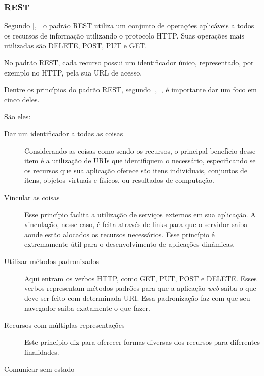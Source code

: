 \documentclass[
	12pt,				%
	oneside,			%
	a4paper,			%
	brazil				%
]{abntex2}
\newcommand{\citecustom}[1]{[\citeauthoronline{#1}, \citeyear{#1}]}
\begin{document}
{\subsubsection{REST}

Segundo \citecustom{Almeida2016} o padrão REST utiliza um conjunto de operações aplicáveis a todos os recursos de informação utilizando o protocolo HTTP. Suas operações mais utilizadas são DELETE, POST, PUT e GET.

No padrão REST, cada recurso possui um identificador único, representado, por exemplo no HTTP, pela sua URL de acesso.

Dentre os princípios do padrão REST, segundo \citecustom{Gomes2009}, é importante dar um foco em cinco deles.

São eles: 

\begin{description}

\item[Dar um identificador a todas as coisas]

Considerando as coisas como sendo os recursos, o principal benefício desse item é a utilização de URIs que identifiquem o necessário, especificando se os recursos que sua aplicação oferece são itens individuais, conjuntos de itens, objetos virtuais e físicos, ou resultados de computação.  

\item[Vincular as coisas]

Esse princípio faclita a utilização de serviços externos em sua aplicação. A vinculação, nesse caso, é feita através de links para que o servidor saiba aonde estão alocados os recursos necessários. Esse princípio é extremamente útil para o desenvolvimento de aplicações dinâmicas.

\item[Utilizar métodos padronizados]

Aqui entram os verbos HTTP, como GET, PUT, POST e DELETE. Esses verbos representam métodos padrões para que a aplicação \textit{web} saiba o que deve ser feito com determinada URI. Essa padronização faz com que seu navegador saiba exatamente o que fazer.

\item[Recursos com múltiplas representações]

Este princípio diz para oferecer formas diversas dos recursos para diferentes finalidades. 	

\item[Comunicar sem estado]


\end{description}}
\end{document}
